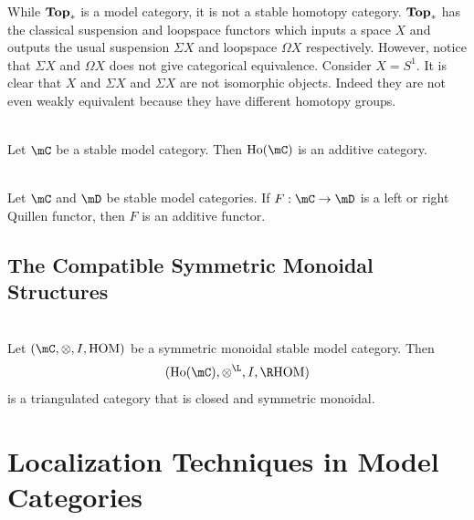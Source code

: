 \documentclass[a4paper]{article}
\begin{document}
While $\bold{Top}_\ast$ is a model category, it is not a stable homotopy category. $\bold{Top}_\ast$ has the classical suspension and loopspace functors which inputs a space $X$ and outputs the usual suspension $\Sigma X$ and loopspace $\Omega X$ respectively. However, notice that $\Sigma X$ and $\Omega X$ does not give categorical equivalence. Consider $X=S^1$. It is clear that $X$ and $\Sigma X$ and $\Sigma X$ are not isomorphic objects. Indeed they are not even weakly equivalent because they have different homotopy groups. 

\begin{thm}{}{}\\ Let $\mC$ be a stable model category. Then $\text{Ho}(\mC)$ is an additive category. 
\end{thm}

\begin{thm}{}{}\\ Let $\mC$ and $\mD$ be stable model categories. If $F:\mC\to\mD$ is a left or right Quillen functor, then $F$ is an additive functor. 
\end{thm}

\subsection{The Compatible Symmetric Monoidal Structures}
\begin{thm}{}{}\\ Let $(\mC,\otimes,I,\text{HOM})$ be a symmetric monoidal stable model category. Then $$(\text{Ho}(\mC),\otimes^\L,I,\R\text{HOM})$$ is a triangulated category that is closed and symmetric monoidal. 
\end{thm}

\pagebreak
\section{Localization Techniques in Model Categories}
\end{document}
